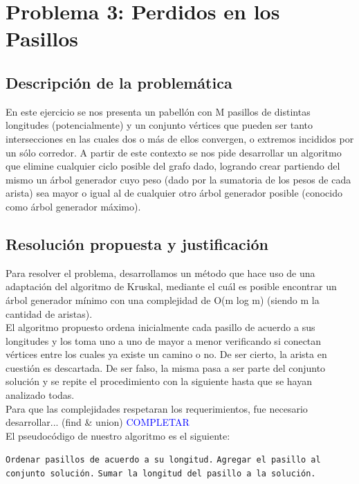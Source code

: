 \section{Problema 3: Perdidos en los Pasillos}

\subsection{Descripción de la problemática}

En este ejercicio se nos presenta un pabellón con M pasillos de distintas longitudes (potencialmente) y un conjunto vértices que pueden ser tanto intersecciones en las cuales dos o más de ellos convergen, o extremos incididos por un sólo corredor. 
A partir de este contexto se nos pide desarrollar un algoritmo que elimine cualquier ciclo posible del grafo dado, logrando crear partiendo del mismo un árbol generador cuyo peso (dado por la sumatoria de los pesos de cada arista) sea mayor o igual al de cualquier otro árbol generador posible (conocido como árbol generador máximo).

\subsection{Resolución propuesta y justificación}

Para resolver el problema, desarrollamos un método que hace uso de una adaptación del algoritmo de Kruskal, mediante el cuál es posible encontrar un árbol generador mínimo con una complejidad de O(m log m) (siendo m la cantidad de aristas).\\
El algoritmo propuesto ordena inicialmente cada pasillo de acuerdo a sus longitudes y los toma uno a uno de mayor a menor verificando si conectan vértices entre los cuales ya existe un camino o no. De ser cierto, la arista en cuestión es descartada. De ser falso, la misma pasa a ser parte del conjunto solución y se repite el procedimiento con la siguiente hasta que se hayan analizado todas.\\
Para que las complejidades respetaran los requerimientos, fue necesario desarrollar... (find \& union) \textcolor{blue}{COMPLETAR} \\
El pseudocódigo de nuestro algoritmo es el siguiente:

\begin{algorithmic} 

\STATE \texttt{Ordenar pasillos de acuerdo a su longitud.}
		\STATE \texttt{Agregar el pasillo al conjunto soluci\'on.}
		\STATE \texttt{Sumar la longitud del pasillo a la soluci\'on.}
	\ENDIF
\ENDFOR
\end{algorithmic} 


